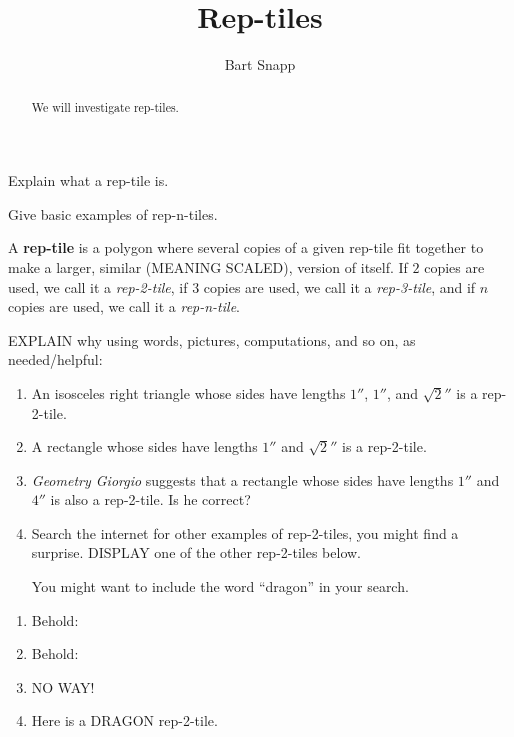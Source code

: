 \documentclass[handout,nooutcomes,noauthor,hints]{ximera}
\title{Rep-tiles}
\author{Bart Snapp}
\begin{document}
\begin{abstract}
  We will investigate rep-tiles.
\end{abstract}
\maketitle



\begin{listOutcomes}
\item Explain what a rep-tile is.
\item Give basic examples of rep-n-tiles.
\end{listOutcomes}


A \textbf{rep-tile} is a polygon where several copies
of a given rep-tile fit together to make a larger, similar (MEANING
SCALED), version of itself. If $2$ copies are used, we call it a
\textit{rep-2-tile}, if $3$ copies are used, we call it a
\textit{rep-3-tile}, and if $n$ copies are used, we call it a
\textit{rep-n-tile}.

\mynewpage

\begin{question}
EXPLAIN why using words, pictures, computations, and so on, as
needed/helpful:
\begin{enumerate}
\item An isosceles right triangle whose sides have lengths $1''$,
  $1''$, and $\sqrt{2}''$ is a rep-2-tile.
\item A rectangle whose sides have lengths $1''$ and $\sqrt{2}''$ is a
  rep-2-tile.
\item \textit{Geometry Giorgio} suggests that a rectangle whose sides
  have lengths $1''$ and $4''$ is also a rep-2-tile. Is he correct?
  \item Search the internet for other examples of rep-2-tiles, you
    might find a surprise. DISPLAY one of the other rep-2-tiles below.
    \begin{hint}
      You might want to include the word ``dragon'' in your
      search.
    \end{hint}
\end{enumerate}
\begin{freeResponse}
  \begin{enumerate}
  \item Behold:
  \item Behold:
  \item NO WAY!
  \item Here is a DRAGON rep-2-tile.
  \end{enumerate}
\end{freeResponse}
\end{question}
\mynewpage
\end{document}

